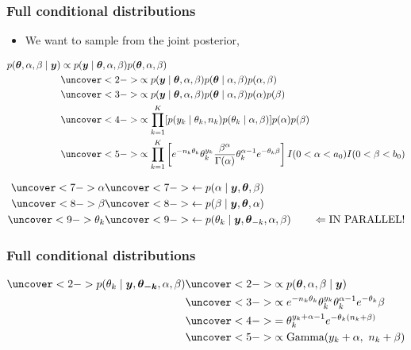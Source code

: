 \documentclass[handout]{beamer}
\providecommand{\vc}[1]{\boldsymbol{#1}}
\numberwithin{equation}{section}
\begin{document}
\begin{frame}
\frametitle{Full conditional distributions} \scriptsize
\begin{itemize}
\item We want to sample from the joint posterior,
\end{itemize}
\begin{align*}
p(\vc{\theta}, \alpha, \beta \mid \vc{y}) &\propto p(\vc{y} \mid \vc{\theta}, \alpha, \beta) p(\vc{\theta}, \alpha, \beta) \\
&\uncover<2->{\propto p(\vc{y} \mid \vc{\theta}, \alpha, \beta) p(\vc{\theta} \mid \alpha, \beta) p(\alpha, \beta)} \\
&\uncover<3->{\propto p(\vc{y} \mid \vc{\theta}, \alpha, \beta) p(\vc{\theta} \mid \alpha, \beta) p(\alpha)p(\beta)} \\
&\uncover<4->{\propto \prod_{k = 1}^K [p(y_k \mid \theta_k, n_k) p(\theta_k \mid \alpha, \beta)] p(\alpha) p(\beta)} \\
&\uncover<5->{\propto \prod_{k = 1}^K \left [e^{-n_k \theta_k} \theta_k^{y_k} \frac{\beta^\alpha}{\Gamma(\alpha)} \theta_k^{\alpha - 1} e^{-\theta_k \beta}\right ] I(0 < \alpha < a_0) I(0 < \beta < b_0) }
\end{align*}
\begin{itemize}
\end{itemize}
\begin{align*}
\uncover<7->{\alpha} &\uncover<7->{\leftarrow p(\alpha \mid \vc{y}, \vc{\theta}, \beta)}  \\
\uncover<8->{\beta} &\uncover<8->{\leftarrow p(\beta \mid \vc{y}, \vc{\theta}, \alpha)} \\
\uncover<9->{\theta_k} &\uncover<9->{\leftarrow p(\theta_k \mid \vc{y}, \vc{\theta}_{-k}, \alpha, \beta) \qquad \Leftarrow \text{IN PARALLEL!}} 
\end{align*}
\end{frame}

\begin{frame}
\frametitle{Full conditional distributions} 
\begin{align*}
\uncover<2->{p(\theta_k \mid \vc{y}, \vc{\theta_{-k}}, \alpha, \beta)} & \uncover<2->{\propto p(\vc{\theta}, \alpha, \beta \mid \vc{y})} \\
&\uncover<3->{\propto e^{-n_k \theta_k} \theta_k^{y_k} \theta_k^{\alpha - 1} e^{- \theta_k} \beta} \\
&\uncover<4->{= \theta_k^{y_k + \alpha - 1} e^{-\theta_k(n_k + \beta)}} \\
&\uncover<5->{\propto \text{Gamma}(y_k + \alpha, \ n_k + \beta)}
\end{align*}
\end{frame}
\end{document}
